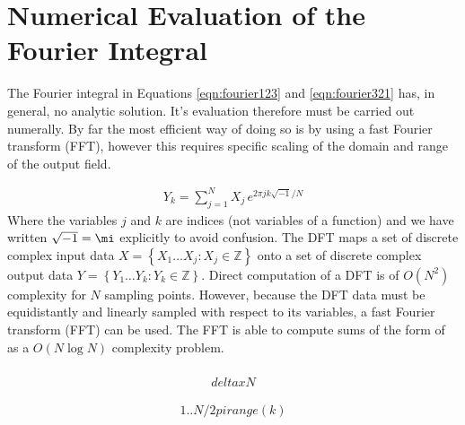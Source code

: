 \section{Numerical Evaluation of the Fourier Integral}
The Fourier integral in Equations \ref{eqn:fourier123} and
\ref{eqn:fourier321} has, in general, no analytic solution.  It's
evaluation therefore must be carried out numerally.  By far the most
efficient way of doing so is by using a fast Fourier transform (FFT),
however this requires specific scaling of the domain and range of the
output field.

\begin{align}
Y_k = \sum_{j=1}^{N} X_j\, e^{2\pi j k\sqrt{-1}/N}
\label{eqn:dft}
\end{align}
Where the variables $j$ and $k$ are indices (not variables of a function)
and we have written $\sqrt{-1}=\mi$ explicitly to avoid confusion.
The DFT maps a set of discrete complex input data
$X = \left\{X_1\dots X_j : X_j\in\mathbb{Z}\right\}$ onto a set of
discrete complex output data $Y =
\left\{Y_1\dots Y_k : Y_k\in\mathbb{Z}\right\}$.  
Direct computation of a DFT is of $O(N^2)$ complexity for $N$ sampling
points.  However, because the DFT data must be equidistantly and linearly
sampled with respect to its variables, a fast Fourier transform (FFT) can
be used. The FFT is able to compute sums of the form of 
as a $O(N \log N)$ complexity problem. 
\begin{align}

\end{align}

\begin{align}
deltax N
\end{align}

\begin{align}
1..N / 2 pi range(k)
\end{align}

